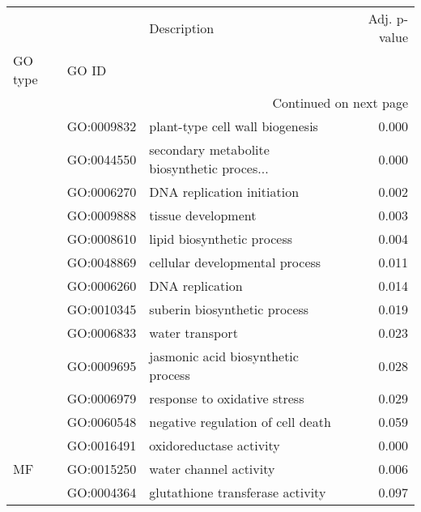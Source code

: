 \begin{longtable}{lllr}
\toprule
   &            &                                  Description &  Adj. p-value \\
GO type & GO ID &                                              &               \\
\midrule
\endhead
\midrule
\multicolumn{4}{r}{{Continued on next page}} \\
\midrule
\endfoot

\bottomrule
\endlastfoot
\multirow{12}{*}{BP} & GO:0009832 &              plant-type cell wall biogenesis &         0.000 \\
   & GO:0044550 &  secondary metabolite biosynthetic proces... &         0.000 \\
   & GO:0006270 &                   DNA replication initiation &         0.002 \\
   & GO:0009888 &                           tissue development &         0.003 \\
   & GO:0008610 &                   lipid biosynthetic process &         0.004 \\
   & GO:0048869 &               cellular developmental process &         0.011 \\
   & GO:0006260 &                              DNA replication &         0.014 \\
   & GO:0010345 &                 suberin biosynthetic process &         0.019 \\
   & GO:0006833 &                              water transport &         0.023 \\
   & GO:0009695 &           jasmonic acid biosynthetic process &         0.028 \\
   & GO:0006979 &                 response to oxidative stress &         0.029 \\
   & GO:0060548 &            negative regulation of cell death &         0.059 \\
\cline{1-4}
\multirow{3}{*}{MF} & GO:0016491 &                      oxidoreductase activity &         0.000 \\
   & GO:0015250 &                       water channel activity &         0.006 \\
   & GO:0004364 &             glutathione transferase activity &         0.097 \\
\end{longtable}
